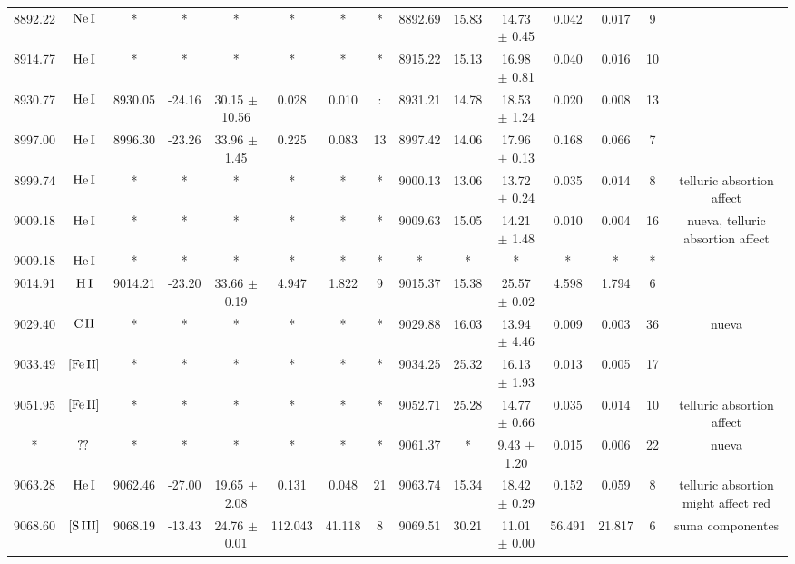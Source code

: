 \documentclass{article}
\begin{document}
\begin{table*}
\begin{adjustbox}{width=\textwidth}
\begin{tabular}{ccccccccccccccc}
8892.22 & $\mbox{Ne}\thinspace \mbox{I}$ & * & * & * & * & * & * & 8892.69 & 15.83 & 14.73 $\pm$ 0.45 & 0.042 & 0.017 & 9 &  \\
8914.77 & $\mbox{He}\thinspace \mbox{I}$ & * & * & * & * & * & * & 8915.22 & 15.13 & 16.98 $\pm$ 0.81 & 0.040 & 0.016 & 10 &  \\
8930.77 & $\mbox{He}\thinspace \mbox{I}$ & 8930.05 & -24.16 & 30.15 $\pm$ 10.56 & 0.028 & 0.010 & : & 8931.21 & 14.78 & 18.53 $\pm$ 1.24 & 0.020 & 0.008 & 13 &  \\
8997.00 & $\mbox{He}\thinspace \mbox{I}$ & 8996.30 & -23.26 & 33.96 $\pm$ 1.45 & 0.225 & 0.083 & 13 & 8997.42 & 14.06 & 17.96 $\pm$ 0.13 & 0.168 & 0.066 & 7 &  \\
8999.74 & $\mbox{He}\thinspace \mbox{I}$ & * & * & * & * & * & * & 9000.13 & 13.06 & 13.72 $\pm$ 0.24 & 0.035 & 0.014 & 8 &  telluric absortion affect \\
9009.18 & $\mbox{He}\thinspace \mbox{I}$ & * & * & * & * & * & * & 9009.63 & 15.05 & 14.21 $\pm$ 1.48 & 0.010 & 0.004 & 16 &  nueva, telluric absortion affect \\
9009.18 & $\mbox{He}\thinspace \mbox{I}$ & * & * & * & * & * & * & * & * & * & * & * & * &  \\
9014.91 & $\mbox{H}\thinspace \mbox{I}$ & 9014.21 & -23.20 & 33.66 $\pm$ 0.19 & 4.947 & 1.822 & 9 & 9015.37 & 15.38 & 25.57 $\pm$ 0.02 & 4.598 & 1.794 & 6 &  \\
9029.40 & $\mbox{C}\thinspace \mbox{II}$ & * & * & * & * & * & * & 9029.88 & 16.03 & 13.94 $\pm$ 4.46 & 0.009 & 0.003 & 36 &  nueva \\
9033.49 & $\mbox{[Fe}\thinspace \mbox{II]}$ & * & * & * & * & * & * & 9034.25 & 25.32 & 16.13 $\pm$ 1.93 & 0.013 & 0.005 & 17 &  \\
9051.95 & $\mbox{[Fe}\thinspace \mbox{II]}$ & * & * & * & * & * & * & 9052.71 & 25.28 & 14.77 $\pm$ 0.66 & 0.035 & 0.014 & 10 &  telluric absortion affect \\
* & $\mbox{??}\thinspace \mbox{}$ & * & * & * & * & * & * & 9061.37 & * & 9.43 $\pm$ 1.20 & 0.015 & 0.006 & 22 &  nueva \\
9063.28 & $\mbox{He}\thinspace \mbox{I}$ & 9062.46 & -27.00 & 19.65 $\pm$ 2.08 & 0.131 & 0.048 & 21 & 9063.74 & 15.34 & 18.42 $\pm$ 0.29 & 0.152 & 0.059 & 8 &  telluric absortion might affect red \\
9068.60 & $\mbox{[S}\thinspace \mbox{III]}$ & 9068.19 & -13.43 & 24.76 $\pm$ 0.01 & 112.043 & 41.118 & 8 & 9069.51 & 30.21 & 11.01 $\pm$ 0.00 & 56.491 & 21.817 & 6 &  suma componentes \\

\end{tabular}
\end{adjustbox}
\end{table*}
\end{document}
